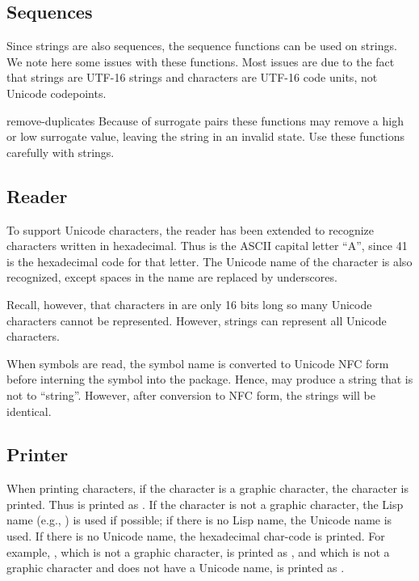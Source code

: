 \subsection{Sequences}

Since strings are also sequences, the sequence functions can be used
on strings.  We note here some issues with these functions.  Most
issues are due to the fact that strings are UTF-16 strings and
characters are UTF-16 code units, not Unicode codepoints.

\begin{defun}{}{remove-duplicates}{\args {}
    }
  Because of surrogate pairs these functions may remove a high or low
  surrogate value, leaving the string in an invalid state.  Use these
  functions carefully with strings.
\end{defun}


\subsection{Reader}

To support Unicode characters, the reader has been extended to
recognize characters written in hexadecimal.  Thus  is
the ASCII capital letter ``A'', since 41 is the hexadecimal code for
that letter.  The Unicode name of the character is also recognized,
except spaces in the name are replaced by underscores.

Recall, however, that characters in \cmucl{} are only 16 bits long so
many Unicode characters cannot be represented.  However, strings can
represent all Unicode characters.

When symbols are read, the symbol name is converted to Unicode NFC
form before interning the symbol into the package.  Hence,
 may produce a string that is
not  to ``string''.  However, after conversion to NFC
form, the strings will be identical.

\subsection{Printer}

When printing characters, if the character is a graphic character, the
character is printed.  Thus  is printed as
.  If the character is not a graphic character, the Lisp
name (e.g., ) is used if possible;
if there is no Lisp name, the Unicode name is used.  If there is no
Unicode name, the hexadecimal char-code is
printed.  For example, , which is not a graphic
character, is printed as ,
and  which is not a graphic character and does not have a
Unicode name, is printed as .

